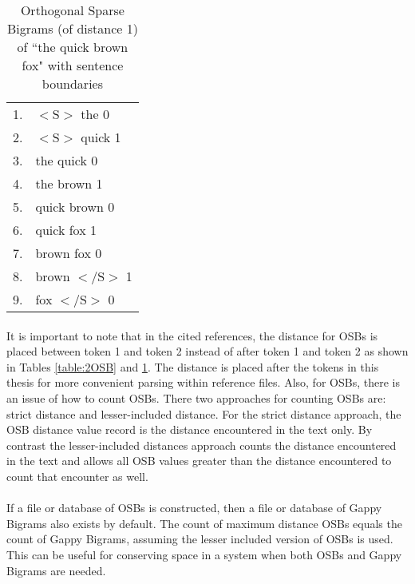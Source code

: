 		\begin{center}
			\begin{table}[h]
			
				\begin{center}
					\begin{tabular}{ r l }
					1. & $<\text{S}>$ the 0\\
					2. & $<\text{S}>$ quick 1\\
					3. & the quick 0\\
					4. & the brown 1\\
					5. & quick brown 0\\
					6. & quick fox 1\\
					7. & brown fox 0\\
					8. & brown $<\text{/S}>$ 1\\
					9. & fox $<\text{/S}>$ 0\\
					\end{tabular}
					\caption{Orthogonal Sparse Bigrams (of distance 1) of ``the quick brown fox" with sentence boundaries}
					\label{table:1OSB}
				\end{center}
			\end{table}
		\end{center}
		
		\paragraph*{} It is important to note that in the cited references, the distance for OSBs is placed between token 1 and token 2 instead of after token 1 and token 2 as shown in Tables \ref{table:2OSB} and \ref{table:1OSB}.  The distance is placed after the tokens in this thesis for more convenient parsing within reference files.  Also, for OSBs, there is an issue of how to count OSBs.  There two approaches for counting OSBs are: strict distance and lesser-included distance.  For the strict distance approach, the OSB distance value record is the distance encountered in the text only.  By contrast the lesser-included distances approach counts the distance encountered in the text and allows all OSB values greater than the distance encountered to count that encounter as well.

		\paragraph*{} If a file or database of OSBs is constructed, then a file or database of Gappy Bigrams also exists by default.  The count of maximum distance OSBs equals the count of Gappy Bigrams, assuming the lesser included version of OSBs is used.  This can be useful for conserving space in a system when both OSBs and Gappy Bigrams are needed.

